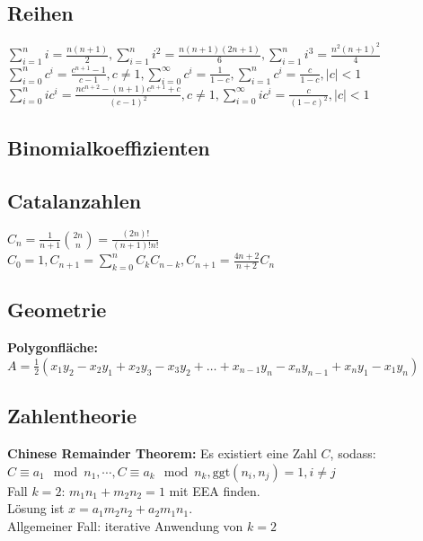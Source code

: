 \documentclass[10pt,a4paper,ngerman,oneside,]{article}
\begin{document}
\begin{multicols}{2}
\subsection{Reihen}
$
\sum\limits_{i=1}^{n}i=\frac{n(n+1)}{2}, \sum\limits_{i=1}^{n}i^2=\frac{n(n+1)(2n+1)}{6}, \sum\limits_{i=1}^{n}i^3=\frac{n^2(n+1)^2}{4}
$\\
$
\sum\limits_{i=0}^{n}c^i=\frac{c^{n+1}-1}{c-1},c\neq 1, \sum\limits_{i=0}^{\infty}c^i=\frac{1}{1-c}, \sum\limits_{i=1}^{n}c^i=\frac{c}{1-c},|c|<1
$\\
$
\sum\limits_{i=0}^{n}ic^i=\frac{nc^{n+2}-(n+1)c^{n+1}+c}{(c-1)^2}, c\neq 1, \sum\limits_{i=0}^{\infty}ic^i=\frac{c}{(1-c)^2}, |c|<1
$

\subsection{Binomialkoeffizienten}


\subsection{Catalanzahlen}
$
C_n=\frac{1}{n+1}\binom{2n}{n}=\frac{(2n)!}{(n+1)!n!}
$\\
$
C_0=1, C_{n+1}=\sum\limits_{k=0}^{n}C_kC_{n-k}, C_{n+1}=\frac{4n+2}{n+2}C_n
$

\subsection{Geometrie}
\textbf{Polygonfläche:} $A=\frac{1}{2}(x_1y_2-x_2y_1+x_2y_3-x_3y_2+\dots+x_{n-1}y_n-x_ny_{n-1}+x_ny_1-x_1y_n)$


\subsection{Zahlentheorie}
\textbf{Chinese Remainder Theorem:} Es existiert eine Zahl $C$, sodass:\\
$
C\equiv a_1\mod n_1,\cdots, C\equiv a_k\mod n_k, \mathrm{ggt}(n_i,n_j)=1,i\neq j
$\\
Fall $k=2$: $m_1n_1+m_2n_2=1$ mit EEA finden.\\
Lösung ist $x=a_1m_2n_2+a_2m_1n_1$.\\
Allgemeiner Fall: iterative Anwendung von $k=2$


\end{multicols}
\end{document}
